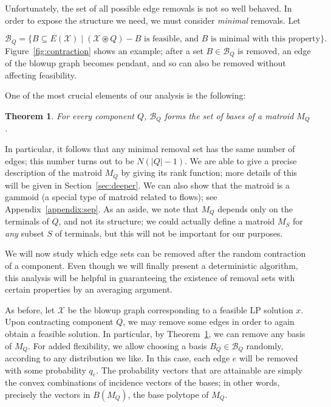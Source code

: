 \documentclass[11pt, letterpaper]{article}
\newtheorem{theorem}{Theorem}[section]
\theoremstyle{definition}
\newcommand{\grphx}{\mathcal{X}}
\newcommand{\remove}{-}
\newcommand{\contract}{\circledast}
\newcommand{\grd}{E(\grphx)}
\begin{document}
Unfortunately, the set of all possible edge removals is not so well behaved.
In order to expose the structure we need, we must consider \emph{minimal} removals. 
Let


	\[ \mathcal{B}_Q = \{ B \subseteq \grd \mid (\grphx \contract Q) \remove B \text{ is feasible, and $B$ is minimal with this property} \}. \]
	Figure~\ref{fig:contraction} shows an example; after a set $B \in \mathcal{B}_Q$ is removed, an edge of the blowup graph becomes pendant, and so can also be removed without affecting feasibility.

One of the most crucial elements of our analysis is the following:
\begin{theorem}\label{thm:isMatroid}
For every component $Q$,
$\mathcal{B}_Q$ forms the set of bases of a matroid $M_Q$.\end{theorem}
In particular, it follows that any minimal removal set has the same number
of edges; this number turns out to be $N(|Q|-1)$.
We are able to give a precise description of the matroid $M_Q$ by giving its rank function; 
more details of this will be given in Section~\ref{sec:deeper}.
We can also show that the matroid is a gammoid (a special type of matroid related to flows); see Appendix~\ref{appendix:sep}.
As an aside, we note that $M_Q$ depends only on the terminals of $Q$, and not its structure; we could actually define a matroid $M_S$ for \emph{any} subset $S$ of terminals, but this will not be important for our purposes.

\medskip 

We will now study which edge sets can be removed after
the random contraction of a component. Even though we will finally
present a deterministic algorithm, this analysis will be helpful in guaranteeing the existence of removal sets with
certain properties by an averaging argument.



As before, let $\grphx$ be the blowup graph corresponding to a feasible LP solution $x$.
Upon contracting component $Q$, we may remove some edges in order to again obtain a feasible solution.
In particular, by Theorem~\ref{thm:isMatroid}, we can remove any basis of $M_Q$.
For added flexibility, we allow choosing
a basis $B_Q \in \mathcal{B}_Q$ randomly, according to any distribution we like.
In this case, each edge $e$ will be removed with some probability $q_e$.
The probability vectors that are attainable are simply the convex combinations of incidence vectors of the bases; in other words, 
precisely the vectors in $B(M_Q)$, the base polytope of $M_Q$.
\end{document}
